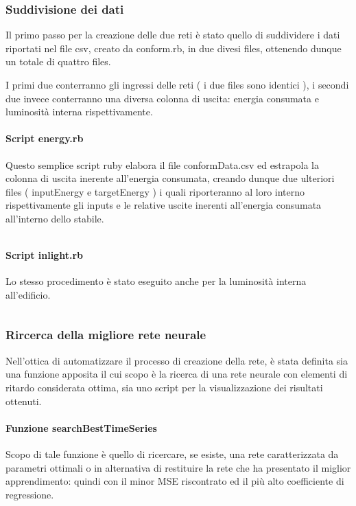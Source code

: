 \subsubsection{Suddivisione dei dati}

Il primo passo per la creazione delle due reti è stato quello di suddividere i dati riportati nel file csv, creato da conform.rb, in due divesi files, ottenendo dunque un totale di quattro files.

I primi due conterranno gli ingressi delle reti ( i due files sono identici ), i secondi due invece conterranno una diversa colonna di uscita: energia consumata e luminosità interna rispettivamente.


\paragraph{Script energy.rb}

Questo semplice script ruby elabora il file conformData.csv ed estrapola la colonna di uscita inerente all'energia consumata, creando dunque due ulteriori files ( inputEnergy e targetEnergy ) i quali riporteranno al loro interno rispettivamente gli inputs e le relative uscite inerenti all'energia consumata all'interno dello stabile.

\inputminted[linenos=true,fontsize=\footnotesize]{ruby}{../../data/time\ series/energy.rb}


\paragraph{Script inlight.rb}

Lo stesso procedimento è stato eseguito anche per la luminosità interna all'edificio.

\inputminted[linenos=true,fontsize=\footnotesize]{ruby}{../../data/time\ series/inlight.rb}


\subsubsection{Rircerca della migliore rete neurale}
Nell'ottica di automatizzare il processo di creazione della rete, è stata definita sia una funzione apposita il cui scopo è la ricerca di una rete neurale con elementi di ritardo considerata ottima, sia uno script per la visualizzazione dei risultati ottenuti.

\paragraph{Funzione searchBestTimeSeries}
Scopo di tale funzione è quello di ricercare, se esiste, una rete caratterizzata da parametri ottimali o in alternativa di restituire la rete che ha presentato il miglior apprendimento: quindi con il minor MSE riscontrato ed il più alto coefficiente di regressione.


